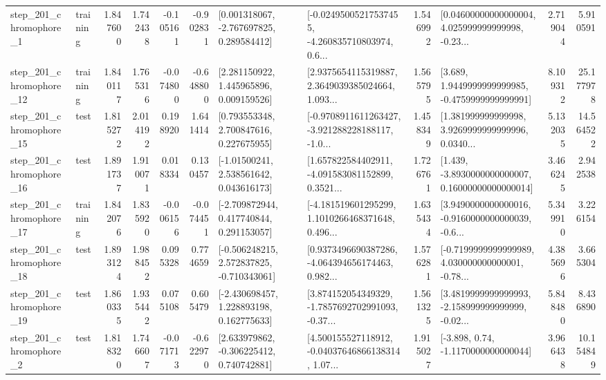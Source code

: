 \begin{tabular}{llrrrrllrlrr}
   step\_201\_chromophore\_1 &  training &      1.847600 &    1.742438 &     -0.105161 & -0.902831 &    [0.001318067, -2.767697825, 0.289584412] &  [-0.02495005217537455, -4.260835710803974, 0.6... &       1.546992 &  [0.04600000000000004, 4.025999999999998, -0.23... &            2.719044 &          5.910591 \\
  step\_201\_chromophore\_12 &  training &      1.840117 &    1.765316 &     -0.074800 & -0.648800 &     [2.281150922, 1.445965896, 0.009159526] &  [2.9375654115319887, 2.3649039385024664, 1.093... &       1.565795 &   [3.689, 1.9449999999999985, -0.4759999999999991] &            8.109312 &         25.177978 \\
  step\_201\_chromophore\_15 &      test &      1.815272 &    2.014192 &      0.198920 &  1.641414 &     [0.793553348, 2.700847616, 0.227675955] &  [-0.9708911611263427, -3.921288228188117, -1.0... &       1.458349 &  [1.381999999999998, 3.9269999999999996, 0.0340... &            5.132035 &         14.564522 \\
  step\_201\_chromophore\_16 &      test &      1.891737 &    1.910071 &      0.018334 &  0.130457 &     [-1.01500241, 2.538561642, 0.043616173] &  [1.657822584402911, -4.091583081152899, 0.3521... &       1.726761 &  [1.439, -3.8930000000000007, 0.16000000000000014] &            3.466245 &          2.942538 \\
  step\_201\_chromophore\_17 &  training &      1.842076 &    1.835920 &     -0.006156 & -0.074451 &    [-2.709872944, 0.417740844, 0.291153057] &  [-4.181519601295299, 1.1010266468371648, 0.496... &       1.635434 &  [3.9490000000000016, -0.9160000000000039, -0.6... &            5.349910 &          3.226154 \\
  step\_201\_chromophore\_18 &      test &      1.893124 &    1.988452 &      0.095328 &  0.774659 &   [-0.506248215, 2.572837825, -0.710343061] &  [0.9373496690387286, -4.064394656174463, 0.982... &       1.576281 &  [-0.7199999999999989, 4.030000000000001, -0.78... &            4.385696 &          3.665304 \\
  step\_201\_chromophore\_19 &      test &      1.860335 &    1.935442 &      0.075108 &  0.605479 &    [-2.430698457, 1.228893198, 0.162775633] &  [3.874152054349329, -1.7857692702991093, -0.37... &       1.561325 &  [3.4819999999999993, -2.158999999999999, -0.02... &            5.848480 &          8.436890 \\
   step\_201\_chromophore\_2 &      test &      1.818320 &    1.746607 &     -0.071713 & -0.622970 &    [2.633979862, -0.306225412, 0.740742881] &  [4.500155527118912, -0.04037646866138314, 1.07... &       1.915027 &                [-3.898, 0.74, -1.1170000000000044] &            3.966438 &         10.154849 \\

\end{tabular}
